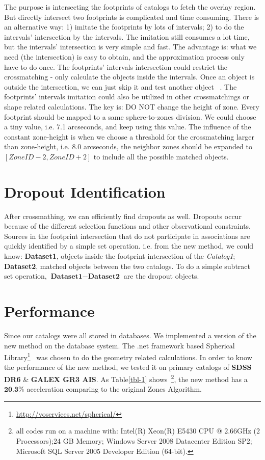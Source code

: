 The purpose is intersecting the footprints of catalogs to fetch the overlay region. But directly intersect two footprints is complicated and time consuming. There is an alternative way: 1) imitate the footprints by lots of intervals; 2) to do the intervals' intersection by the intervals. The imitation still consumes a lot time, but the intervals' intersection is very simple and fast. The advantage is: what we need (the intersection) is easy to obtain, and the approximation process only have to do once. The footprints' intervals intersection could restrict the crossmatching - only calculate the objects inside the intervals. Once an object is outside the intersection, we can just skip it and test another object ~\citep{dongwei}. The footprints' intervals imitation could also be utilized in other crossmatchings or shape related calculations. The key is: DO NOT change the height of zone. Every footprint should be mapped to a same sphere-to-zones division. We could choose a tiny value, i.e. 7.1 arcseconds, and keep using this value. The influence of the constant zone-height is when we choose a threshold for the crossmatching larger than zone-height, i.e. 8.0 arcseconds, the neighbor zones should be expanded to $\left[\textit{ZoneID}-2,\textit{ZoneID}+2\right]$ to include all the possible matched objects. 

\section{Dropout Identification}
After crossmathing, we can efficiently find dropouts as well. Dropouts occur because of the different selection functions and other observational constraints. Sources in the footprint intersection that do not participate in associations are quickly identified by a simple set operation. i.e. from the new method, we could know: \textbf{Dataset1}, objects inside the footprint intersection of the \textit{Catalog1}; \textbf{Dataset2}, matched objects between the two catalogs. To do a simple subtract set operation, $\textbf{Dataset1}-\textbf{Dataset2}$ are the dropout objects.

\section{Performance}
Since our catalogs were all stored in databases. We implemented a version of the new method on the database system. The .net framework based Spherical Library\footnote{\url{http://voservices.net/spherical/}}~\citep{Budavari:2010ek, 2007cs........1163G} was chosen to do the geometry related calculations. In order to know the performance of the new method, we tested it on primary catalogs of \textbf{SDSS DR6} \& \textbf{GALEX GR3 AIS}. As Table\ref{tbl-1} shows~\footnote{all codes run on a machine with: Intel(R) Xeon(R) E5430 CPU @ 2.66GHz (2 Processors);24 GB Memory; Windows Server 2008 Datacenter Edition SP2; Microsoft SQL Server 2005 Developer Edition (64-bit).}, the new method has a $\textbf{20.3\%}$ acceleration comparing to the original Zones Algorithm.


